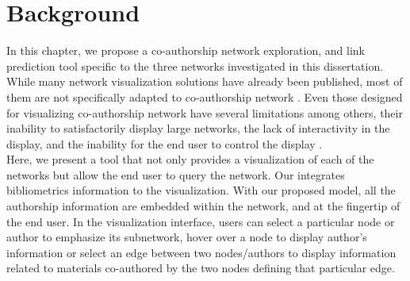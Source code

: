 


\section{Background}
In this chapter, we propose a co-authorship network exploration, and link prediction tool specific to the three networks investigated in this dissertation. While many network visualization solutions have already been published, most of them are not specifically adapted to co-authorship network \cite{nakazono_nel_2006,odoni_visualisation_2017,liu_toolkits_2004,horak_forcoa.net:_2011}. 
Even those designed for visualizing co-authorship network have several limitations among others, their inability to satisfactorily display large networks, the lack of interactivity in the display, and the inability for the end user to control the display \cite{nakazono_nel_2006}.\\
Here, we present a tool that not only provides a visualization of each of the networks but allow the end user to query the network. Our integrates bibliometrics information to the visualization. With our proposed model, all the authorship information are embedded within the network, and at the fingertip of the end user. 
In the visualization interface, users can select a particular node or author to emphasize its subnetwork, hover over a node to display author's information or select an edge between two nodes/authors to display information related to materials co-authored by the two nodes defining that particular edge. 

